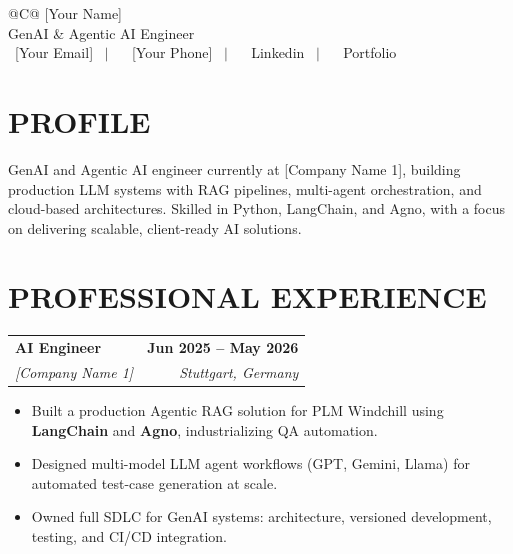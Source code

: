 \documentclass[a4paper,11pt]{article}
\makeatletter
\newcommand{\entryheader}[4]{%
  \begin{tabularx}{\textwidth}{@{}>{\RaggedRight\arraybackslash}X r@{}}
    \textbf{#1} & \textbf{#2} \\
    \textit{#3} & \textit{#4} \\
  \end{tabularx}%
}
\newenvironment{entrybullets}{%
  \begin{minipage}[t]{0.77\textwidth}
    \begin{itemize}[leftmargin=*,label=\textbullet,align=left]
}{%
    \end{itemize}
  \end{minipage}
}
\newcommand{\safehref}[2]{#2}
\let\href\safehref
\makeatother
\begin{document}
\pagestyle{empty}

\begin{tabularx}{\linewidth}{@{}C@{}}
  \Huge{[Your Name]}\\[10pt]
  
  \large{GenAI \& Agentic AI Engineer}\\[3pt]


  \href{mailto: [Your Email]}{\raisebox{-0.05\height}{\faEnvelope} \ [Your Email]} \ $|$ \
  \href{tel:[Your Phone]}{ \ [Your Phone]} \ $|$ \
  \href{[Your LinkedIn URL]}{\raisebox{-0.05\height}{\faLinkedin} \ Linkedin} \ $|$ \
  \href{[Your Portfolio URL]}{\raisebox{-0.05\height}{\faLink} \ Portfolio}\\
\end{tabularx}

\section*{PROFILE}
GenAI and Agentic AI engineer currently at [Company Name 1], building production LLM systems with RAG pipelines, multi-agent orchestration, and cloud-based architectures. Skilled in Python, LangChain, and Agno, with a focus on delivering scalable, client-ready AI solutions.


\section*{PROFESSIONAL EXPERIENCE}
\entryheader{AI Engineer}{Jun 2025 -- May 2026}{[Company Name 1]}{Stuttgart, Germany}
\begin{entrybullets}
  \item Built a production Agentic RAG solution for PLM Windchill using \textbf{LangChain} and \textbf{Agno}, industrializing QA automation.
  \item Designed multi-model LLM agent workflows (GPT, Gemini, Llama) for automated test-case generation at scale.
  \item Owned full SDLC for GenAI systems: architecture, versioned development, testing, and CI/CD integration.
\end{entrybullets}
\end{document}
